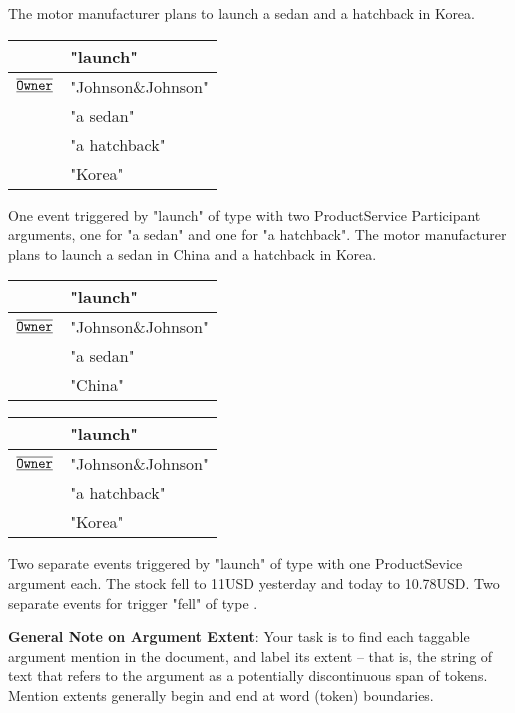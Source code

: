 \begin{exe}
    \ex The motor manufacturer plans to launch a sedan and a hatchback in Korea.
        \expl \begin{tabular}{|L{6cm}|L{7cm}|} \hline
             & "launch" \\\hline
            $\overline{\underline{\texttt{Owner}}}$ & "Johnson\&Johnson" \\
             & "a sedan" \\
             & "a hatchback" \\
             & "Korea" \\\hline \end{tabular}
    \expl One event triggered by "launch" of type  with two ProductService Participant arguments, one for "a sedan" and one for "a hatchback".
    \ex The motor manufacturer plans to launch a sedan in China and a hatchback in Korea.
        \expl \begin{tabular}{|L{6cm}|L{7cm}|} \hline
             & "launch" \\\hline
            $\overline{\underline{\texttt{Owner}}}$ & "Johnson\&Johnson" \\
             & "a sedan" \\
             & "China" \\\hline \end{tabular}
        \expl \begin{tabular}{|L{6cm}|L{7cm}|} \hline
             & "launch" \\\hline
            $\overline{\underline{\texttt{Owner}}}$ & "Johnson\&Johnson" \\
             & "a hatchback" \\
             & "Korea" \\\hline \end{tabular}
        \expl Two separate events triggered by "launch" of type  with one ProductSevice argument each.
    \ex The stock fell to 11USD yesterday and today to 10.78USD.
        \expl Two separate events for trigger "fell" of type .
\end{exe}

\textbf{General Note on Argument Extent}:
Your task is to find each taggable argument mention in the document, and label its extent – that is, the string of text that refers to the argument as a potentially discontinuous span of tokens.
Mention extents generally begin and end at word (token) boundaries.


